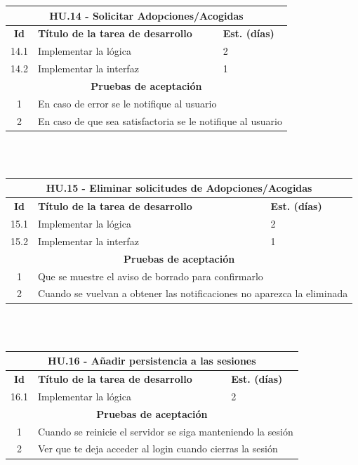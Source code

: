 \begin{tabular}{|c|p{9.5cm}|p{1cm}|}
	\hline
	\multicolumn{3}{|c|}{\textbf{HU.14 - Solicitar Adopciones/Acogidas}} \\
	\hline
	\textbf{Id} & \textbf{Título de la tarea de desarrollo} & \textbf{Est. (días)} \\
	\hline
	14.1 &  Implementar la lógica & 2 \\ \hline
	14.2 &  Implementar la interfaz & 1 \\ \hline
	\multicolumn{3}{|c|}{\textbf{Pruebas de aceptación}} \\ \hline
	1 & \multicolumn{2}{|p{12cm}|}{En caso de error se le notifique al usuario} \\ \hline
	2 & \multicolumn{2}{|p{12cm}|}{En caso de que sea satisfactoria se le notifique al usuario} \\ \hline
	
\end{tabular} \\ \\

\begin{tabular}{|c|p{9.5cm}|p{1cm}|}
	\hline
	\multicolumn{3}{|c|}{\textbf{HU.15 - Eliminar solicitudes de Adopciones/Acogidas}} \\
	\hline
	\textbf{Id} & \textbf{Título de la tarea de desarrollo} & \textbf{Est. (días)} \\
	\hline
	15.1 &  Implementar la lógica & 2 \\ \hline
	15.2 &  Implementar la interfaz & 1 \\ \hline
	\multicolumn{3}{|c|}{\textbf{Pruebas de aceptación}} \\ \hline
	1 & \multicolumn{2}{|p{12cm}|}{Que se muestre el aviso de borrado para confirmarlo} \\ \hline
	2 & \multicolumn{2}{|p{12cm}|}{Cuando se vuelvan a obtener las notificaciones no aparezca la eliminada} \\ \hline
	
\end{tabular} \\ \\

\begin{tabular}{|c|p{9.5cm}|p{1cm}|}
	\hline
	\multicolumn{3}{|c|}{\textbf{HU.16 - Añadir persistencia a las sesiones}} \\
	\hline
	\textbf{Id} & \textbf{Título de la tarea de desarrollo} & \textbf{Est. (días)} \\
	\hline
	16.1 &  Implementar la lógica & 2 \\ \hline
	\multicolumn{3}{|c|}{\textbf{Pruebas de aceptación}} \\ \hline
	1 & \multicolumn{2}{|p{12cm}|}{Cuando se reinicie el servidor se siga manteniendo la sesión} \\ \hline
	2 & \multicolumn{2}{|p{12cm}|}{Ver que te deja acceder al login cuando cierras la sesión} \\ \hline
	
\end{tabular} \\ \\


